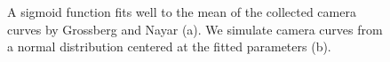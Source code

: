 \documentclass[acmtog]{acmart}
\begin{document}
\begin{figure}
	\centering
	\vspace{-2pt}
	\vspace{-5pt}
	\caption{\label{fig:cc} A sigmoid function fits well to the mean of the collected camera curves by Grossberg and Nayar \citeyear{Grossberg2003} (a). We simulate camera curves from a normal distribution centered at the fitted parameters (b).}
\end{figure}
 
 
\end{document}
